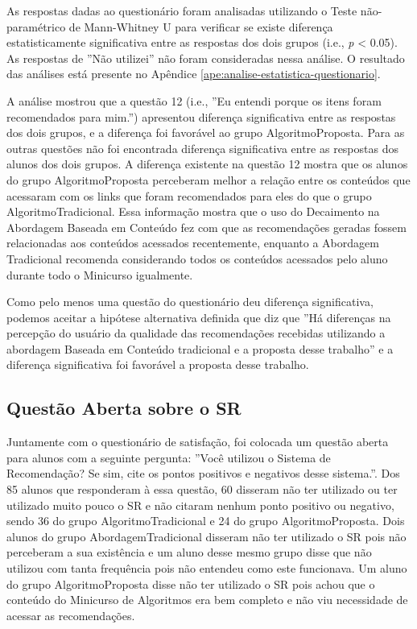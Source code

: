 As respostas dadas ao questionário foram analisadas utilizando o Teste não-paramétrico de
Mann-Whitney U para verificar se existe diferença estatisticamente significativa entre as respostas dos dois grupos (i.e., \textit{p} < 0.05).
As respostas de ''Não utilizei'' não foram consideradas nessa análise. O resultado das análises está presente no Apêndice
\ref{ape:analise-estatistica-questionario}.

A análise mostrou que a questão 12 (i.e., ''Eu entendi porque os itens foram recomendados para mim.'') apresentou
diferença significativa entre as respostas dos dois grupos, e a diferença foi favorável ao grupo AlgoritmoProposta.
Para as outras questões não foi encontrada diferença significativa entre as respostas dos
alunos dos dois grupos. A diferença existente na questão 12 mostra que os alunos do grupo AlgoritmoProposta perceberam
melhor a relação entre os conteúdos que acessaram com os links que foram recomendados para eles
do que o grupo AlgoritmoTradicional. Essa informação mostra que o uso do Decaimento na Abordagem
Baseada em Conteúdo fez com que as recomendações geradas fossem relacionadas aos conteúdos acessados recentemente,
enquanto a Abordagem Tradicional recomenda considerando todos os conteúdos acessados pelo aluno durante todo o Minicurso
igualmente.

Como pelo menos uma questão do questionário deu diferença significativa, podemos aceitar a hipótese alternativa definida
que diz que ''Há diferenças na percepção do usuário da qualidade das recomendações recebidas utilizando a abordagem
Baseada em Conteúdo tradicional e a proposta desse trabalho'' e a diferença significativa foi favorável a proposta desse trabalho.

\subsection{Questão Aberta sobre o SR}\label{subsection:questao-aberta}

Juntamente com o questionário de satisfação, foi colocada um questão aberta para alunos com a seguinte pergunta:
''Você utilizou o Sistema de Recomendação? Se sim, cite os pontos positivos e negativos desse sistema.''. Dos 85 alunos
que responderam à essa questão, 60 disseram não ter utilizado ou ter utilizado muito pouco o SR
e não citaram nenhum ponto positivo ou negativo, sendo 36 do grupo AlgoritmoTradicional
e 24 do grupo AlgoritmoProposta. Dois alunos do grupo AbordagemTradicional disseram
não ter utilizado o SR pois não perceberam a sua existência e um aluno desse mesmo grupo disse que não utilizou com tanta frequência
pois não entendeu como este funcionava. Um aluno do grupo AlgoritmoProposta disse não ter utilizado
o SR pois achou que o conteúdo do Minicurso de Algoritmos era bem completo e não viu necessidade de acessar as recomendações.

